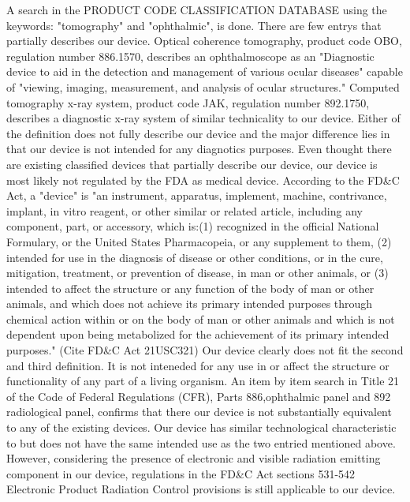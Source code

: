 \documentclass{article}
\begin{document}
A search in the PRODUCT CODE CLASSIFICATION DATABASE using the
keywords: "tomography" and "ophthalmic", is done. There are few entrys
that partially describes our device. Optical coherence tomography,
product code OBO, regulation number 886.1570, describes an
ophthalmoscope as an "Diagnostic device to aid in the detection and
management of various ocular diseases" capable of "viewing, imaging,
measurement, and analysis of ocular structures."  Computed tomography
x-ray system, product code JAK, regulation number 892.1750, describes
a diagnostic x-ray system of similar technicality to our
device. Either of the definition does not fully describe our device
and the major difference lies in that our device is not intended for
any diagnotics purposes.  Even thought there are existing classified
devices that partially describe our device, our device is most likely
not regulated by the FDA as medical device. According to the FD\&C Act,
a "device" is "an instrument, apparatus, implement, machine,
contrivance, implant, in vitro reagent, or other similar or related
article, including any component, part, or accessory, which is:(1)
recognized in the official National Formulary, or the United States
Pharmacopeia, or any supplement to them, (2) intended for use in the
diagnosis of disease or other conditions, or in the cure, mitigation,
treatment, or prevention of disease, in man or other animals, or (3)
intended to affect the structure or any function of the body of man or
other animals, and which does not achieve its primary intended
purposes through chemical action within or on the body of man or other
animals and which is not dependent upon being metabolized for the
achievement of its primary intended purposes." (Cite FD\&C Act
21USC321) Our device clearly does not fit the second and third
definition. It is not inteneded for any use in or affect the structure
or functionality of any part of a living organism. An item by item
search in Title 21 of the Code of Federal Regulations (CFR), Parts
886,ophthalmic panel and 892 radiological panel, confirms that there
our device is not substantially equivalent to any of the existing
devices. Our device has similar technological characteristic to but
does not have the same intended use as the two entried mentioned
above.  However, considering the presence of electronic and visible
radiation emitting component in our device, regulations in the FD\&C
Act sections 531-542 Electronic Product Radiation Control provisions
is still applicable to our device.








\end{document}
